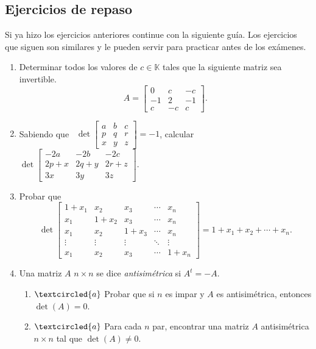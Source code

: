 \documentclass[a4paper,12pt,twoside,spanish,reqno]{amsbook}
\numberwithin{equation}{section}
\begin{document}
\subsection*{Ejercicios de repaso}
Si ya hizo los ejercicios anteriores continue con la siguiente guía. Los ejercicios que siguen son similares y le pueden servir para practicar antes de los exámenes.


\begin{enumerate}[resume, topsep=6pt,itemsep=.4cm]
\item Determinar todos los valores de $c\in\mathbb{K}$ tales que la siguiente matriz sea invertible.
$$A=\begin{bmatrix} 0&c&-c\\ -1&2&-1\\c&-c&c\end{bmatrix}.$$


\item Sabiendo que \
$
\det \begin{bmatrix} a&b&c\\ p&q&r\\
x&y&z\end{bmatrix}=-1
$,
calcular \
$
\det \begin{bmatrix} -2a&-2b&-2c\\ 2p+x&2q+y&2r+z\\
3x&3y&3z\end{bmatrix}.
$

\item Probar que
$$
\det\begin{bmatrix}
1+x_1 & x_2 & x_3 & \cdots & x_n \\
x_1 & 1+x_2 & x_3 & \cdots & x_n \\
x_1 & x_2 & 1+x_3 & \cdots & x_n \\
\vdots & \vdots & \vdots &\ddots& \vdots \\
x_1 & x_2 & x_3 & \cdots & 1+x_n
\end{bmatrix}
= 1+x_1+x_2 + \cdots + x_n.
$$


\item
Una matriz $A$ $n \times n$ se dice {\it antisimétrica}
si $A^t=-A$.


\begin{enumerate}
\item\label{anti a} $\textcircled{a}$ Probar que si $n$ es impar y $A$ es antisimétrica, entonces
$\det(A)=0$.


\item\label{anti b} $\textcircled{a}$ Para cada $n$ par, encontrar una matriz $A$ antisimétrica
$n \times n$ tal que $\det(A)\not=0$.
\end{enumerate}
	
	
\end{enumerate}
\end{document}
